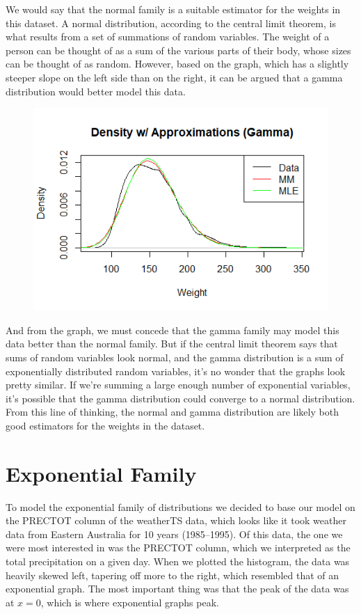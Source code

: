 \documentclass[12pt, a4paper, oneside]{report}
\begin{document}
\newpage
We would say that the normal family is a suitable estimator for the weights in this dataset. A normal distribution, according to the central limit theorem, is what results from a set of summations of random variables. The weight of a person can be thought of as a sum of the various parts of their body, whose sizes can be thought of as random. 
However, based on the graph, which has a slightly steeper slope on the left side than on the right, it can be argued that a gamma distribution would better model this data. 

\begin{figure}[h]
  \centering
  \includegraphics[width=\linewidth]{normButGamma.png}
\end{figure}

And from the graph, we must concede that the gamma family may model this data better than the normal family. But if the central limit theorem says that sums of random variables look normal, and the gamma distribution is a sum of exponentially distributed random variables, it’s no wonder that the graphs look pretty similar. If we’re summing a large enough number of exponential variables, it’s possible that the gamma distribution could converge to a normal distribution. From this line of thinking, the normal and gamma distribution are likely both good estimators for the weights in the dataset.












\newpage
\section*{Exponential Family}
To model the exponential family of distributions we decided to base our model on the PRECTOT column of the weatherTS data, which looks like it took weather data from Eastern Australia for 10 years (1985--1995).
Of this data, the one we were most interested in was the PRECTOT column, which we interpreted as the total precipitation on a given day.
When we plotted the histogram, the data was heavily skewed left, tapering off more to the right, which resembled that of an exponential graph.
The most important thing was that the peak of the data was at \(x = 0\), which is where exponential graphs peak.
\end{document}
